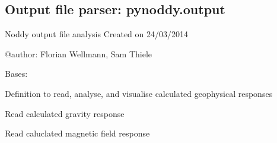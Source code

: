 \documentclass[a4paper,10pt,english]{sphinxmanual}
\begin{document}
\subsection{Output file parser: pynoddy.output}
\label{pynoddy:module-pynoddy.output}\label{pynoddy:output-file-parser-pynoddy-output}
Noddy output file analysis
Created on 24/03/2014

@author: Florian Wellmann, Sam Thiele

\begin{fulllineitems}
\label{pynoddy:pynoddy.output.NoddyGeophysics}
Bases: 

Definition to read, analyse, and visualise calculated geophysical responses

\begin{fulllineitems}
\label{pynoddy:pynoddy.output.NoddyGeophysics.read_gravity}
Read calculated gravity response

\end{fulllineitems}


\begin{fulllineitems}
\label{pynoddy:pynoddy.output.NoddyGeophysics.read_magnetics}
Read caluclated magnetic field response

\end{fulllineitems}


\end{fulllineitems}

\end{document}
